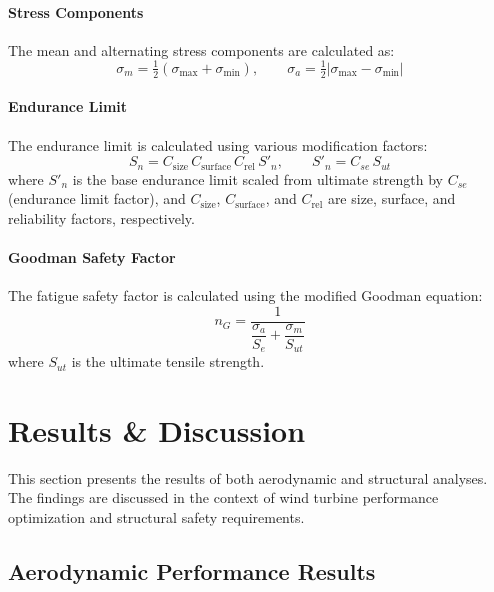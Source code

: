 \documentclass[11pt]{article}
\begin{document}
\paragraph{Stress Components}

The mean and alternating stress components are calculated as:
\begin{equation}
 \sigma_m = \tfrac{1}{2}(\sigma_{\text{max}}+\sigma_{\text{min}}), \qquad \sigma_a = \tfrac{1}{2}|\sigma_{\text{max}}-\sigma_{\text{min}}|
\label{eq:mean_alt}
\end{equation}

\paragraph{Endurance Limit}

The endurance limit is calculated using various modification factors:
\begin{equation}
 S_n = C_{\text{size}}\,C_{\text{surface}}\,C_{\text{rel}}\,S'_n, \qquad S'_n = C_{se}\,S_{ut}
\label{eq:Sn}
\end{equation}
where $S'_n$ is the base endurance limit scaled from ultimate strength by $C_{se}$ (endurance limit factor), and $C_{\text{size}}$, $C_{\text{surface}}$, and $C_{\text{rel}}$ are size, surface, and reliability factors, respectively.

\paragraph{Goodman Safety Factor}

The fatigue safety factor is calculated using the modified Goodman equation:
\begin{equation}
 n_G = \frac{1}{\dfrac{\sigma_a}{S_e} + \dfrac{\sigma_m}{S_{ut}}}
\label{eq:goodman}
\end{equation}
where $S_{ut}$ is the ultimate tensile strength.

\section{Results \& Discussion}

This section presents the results of both aerodynamic and structural analyses. The findings are discussed in the context of wind turbine performance optimization and structural safety requirements.

\subsection{Aerodynamic Performance Results}
\end{document}
